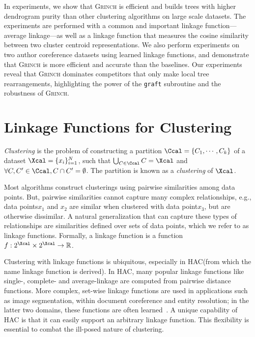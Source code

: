 \documentclass{article} \usepackage[utf8]{inputenc} \usepackage[T1]{fontenc}    \usepackage{hyperref}       \usepackage{url}            \usepackage{booktabs}       \usepackage{amsfonts}       \usepackage{nicefrac}       \usepackage{microtype}      \usepackage{geometry}
\newcommand{\alg}{\textsc{Grinch}\xspace}
\newcommand{\records}{data points\xspace}
\newcommand{\record}{data point\xspace}
\newcommand{\hac}{\textsc{HAC}\xspace}
\newcommand{\graft}{\texttt{graft}\xspace}
\newcommand{\hof}{linkage function\xspace}
\newcommand{\hofs}{linkage functions\xspace}
\begin{document}
In experiments, we show that \alg is efficient and builds trees with
higher dendrogram purity than other clustering algorithms on large
scale datasets.  The experiments are performed with a common and
important \hof---average linkage---as well as a \hof that
measures the cosine similarity between
two cluster centroid representations. We also perform experiments on two author
coreference datasets using learned \hofs, and demonstrate that \alg is
more efficient and accurate than the baselines. Our experiments
reveal that \alg dominates competitors that only make local tree
rearrangements, highlighting the power of the \graft subroutine and
the robustness of \alg. \section{Linkage Functions for Clustering}
\label{sec:clustering}
\emph{Clustering} is the problem of constructing a partition $\Ccal =
\{C_1, \cdots, C_k\}$ of a dataset $\Xcal = \{x_i\}_{i=1}^{N}$, such
that $\bigcup_{C \in \Ccal} C = \Xcal$ and $\forall C, C' \in \Ccal, C
\cap C' = \emptyset$. The partition is known as a \emph{clustering} of
$\Xcal$.

Most algorithms construct clusterings using pairwise similarities
among \records. But, pairwise similarities cannot capture many
complex relationships, e.g., \records $x_1$ and $x_2$ are similar when
clustered with \record $x_3$, but are otherwise dissimilar.  A natural
generalization that can capture these types of relationships are
similarities defined over sets of \records, which we refer to as
\hofs. Formally, a \hof is a function
$f: 2^\Xcal \times 2^\Xcal \rightarrow \mathbb{R}$.

Clustering with \hofs is ubiquitous, especially in \hac (from which
the name \hof is derived).  In \hac, many popular linkage functions
like single-, complete- and average-linkage are computed from pairwise
distance functions. More complex, set-wise \hofs are used in
applications such as image segmentation, within document coreference
and entity resolution; in the latter two domains, these functions are
often learned~\cite{clark2016improving, kohli2009robust,
  haghighi2010coreference, wiseman2016learning,
  zhang2013probabilistic}.  A unique capability of \hac is that it can
easily support an arbitrary \hof. This flexibility is essential to
combat the ill-posed nature of clustering.
\end{document}
